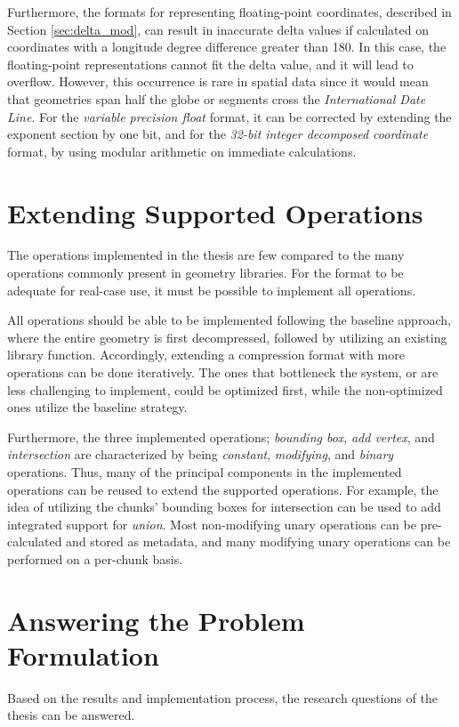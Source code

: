   Furthermore, the formats for representing floating-point coordinates, described in Section \ref{sec:delta_mod}, can result in inaccurate delta values if calculated on coordinates with a longitude degree difference greater than 180. In this case, the floating-point representations cannot fit the delta value, and it will lead to overflow. However, this occurrence is rare in spatial data since it would mean that geometries span half the globe or segments cross the \textit{International Date Line}. For the \textit{variable precision float} format, it can be corrected by extending the exponent section by one bit, and for the \textit{32-bit integer decomposed coordinate} format, by using modular arithmetic on immediate calculations.


\section{Extending Supported Operations}
The operations implemented in the thesis are few compared to the many operations commonly present in geometry libraries. For the format to be adequate for real-case use, it must be possible to implement all operations.


All operations should be able to be implemented following the baseline approach, where the entire geometry is first decompressed, followed by utilizing an existing library function. Accordingly, extending a compression format with more operations can be done iteratively. The ones that bottleneck the system, or are less challenging to implement, could be optimized first, while the non-optimized ones utilize the baseline strategy.

Furthermore, the three implemented operations; \textit{bounding box}, \textit{add vertex}, and \textit{intersection} are characterized by being \textit{constant}, \textit{modifying},
and \textit{binary} operations. Thus, many of the principal components in the implemented operations can be reused to extend the supported operations.
For example, the idea of utilizing the chunks' bounding boxes for intersection can be used to add integrated support for \textit{union}.  Most non-modifying unary operations can be pre-calculated and stored as metadata, and many modifying unary operations can be performed on a per-chunk basis.

\section{Answering the Problem Formulation}
Based on the results and implementation process, the research questions of the thesis can be answered.

